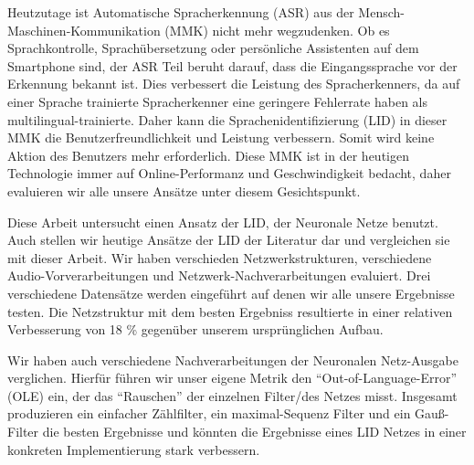 
\Abstract

Heutzutage ist Automatische Spracherkennung (ASR) aus der Mensch-Maschinen-\newline Kommunikation (MMK) nicht mehr wegzudenken. Ob es Sprachkontrolle, Sprachübersetzung oder persönliche Assistenten auf dem Smartphone sind, der ASR Teil beruht darauf,  dass die Eingangssprache vor der Erkennung bekannt ist. Dies verbessert die Leistung des Spracherkenners, da auf einer Sprache trainierte Spracherkenner eine geringere Fehlerrate haben als multilingual-trainierte. Daher kann die Sprachenidentifizierung (LID) in dieser MMK die Benutzerfreundlichkeit und Leistung verbessern. Somit wird keine Aktion des Benutzers mehr erforderlich. Diese MMK ist in der heutigen Technologie immer auf Online-Performanz und Geschwindigkeit bedacht, daher evaluieren wir alle unsere Ansätze unter diesem Gesichtspunkt.

Diese Arbeit untersucht einen Ansatz der LID, der Neuronale Netze benutzt. Auch stellen wir heutige Ansätze der LID der Literatur dar und vergleichen sie mit dieser Arbeit. Wir haben verschieden Netzwerkstrukturen, verschiedene Audio-Vorverarbeitungen und Netzwerk-Nachverarbeitungen evaluiert. Drei verschiedene Datensätze werden eingeführt auf denen wir alle unsere Ergebnisse testen. Die Netzstruktur mit dem besten Ergebniss resultierte in einer relativen Verbesserung von 18 \% gegenüber unserem ursprünglichen Aufbau.

Wir haben auch verschiedene Nachverarbeitungen der Neuronalen Netz-Ausgabe verglichen. Hierfür führen wir unser eigene Metrik den ``Out-of-Language-Error'' (OLE) ein, der das ``Rauschen'' der einzelnen Filter/des Netzes misst. Insgesamt produzieren ein einfacher Zählfilter, ein maximal-Sequenz Filter und ein Gauß-Filter die besten Ergebnisse und könnten die Ergebnisse eines LID Netzes in einer konkreten Implementierung stark verbessern.